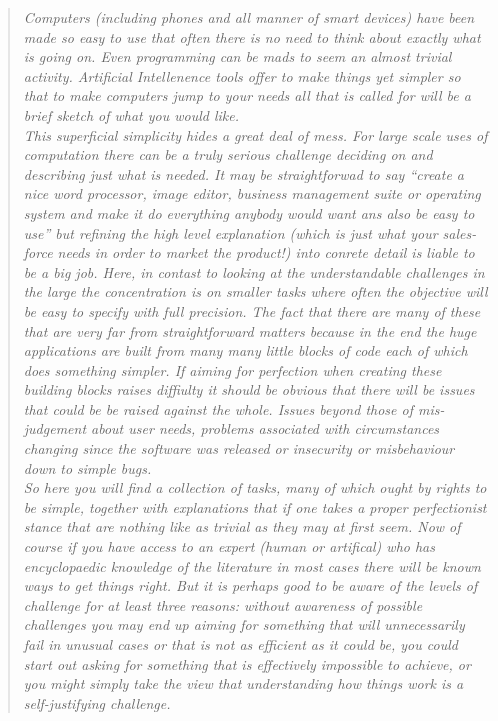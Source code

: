 \begin{quotation}\textit{
Computers (including phones and all manner of smart devices) have been
made so easy to use that often there is no need to think about exactly what
is going on. Even programming can be mads to seem an almost trivial
activity. Artificial Intellenence tools offer to make things yet simpler so
that to make computers jump to your needs all that is called for will be
a brief sketch of what you would like. \\
This superficial simplicity hides a great deal of mess. For large scale uses
of computation there can be a truly serious challenge deciding on and
describing just what is needed. It may be straightforwad to say ``create
a nice word processor, image editor, business management suite or operating
system  and make it do everything anybody would want ans also be easy to use''
but refining the high level explanation (which is just what your sales-force
needs in order to market the product!) into conrete detail is liable to be
a big job. Here, in contast to looking at the understandable challenges 
in the large the concentration is on smaller tasks where often the objective
will be easy to specify with full precision. The fact that there are many
of these that are very far from straightforward matters because in the end
the huge applications are built from many many little blocks of code each of
which does something simpler. If aiming for perfection when creating these
building blocks raises diffiulty it should be obvious that there will be
issues that could be be raised against the whole. Issues beyond those of
mis-judgement about user needs, problems associated with circumstances
changing since the software was released or insecurity or misbehaviour down to
simple bugs.\\
So here you will find a collection of tasks, many of
which ought by rights to be simple, together with explanations that if
one takes a proper perfectionist stance that are nothing like as
trivial as they may at first seem. Now of course if you have access to an
expert (human or artifical) who has encyclopaedic knowledge of the literature 
in most cases there will be known ways to get things right. But it is perhaps
good to be aware of the levels of challenge for at least three reasons:
without awareness of possible challenges you may end up aiming for something
that will unnecessarily fail in unusual cases or that is not as efficient as
it could be, you could start out asking for something that is effectively
impossible to achieve, or you might simply take the view that understanding how
things work is a self-justifying challenge.
}\end{quotation}
